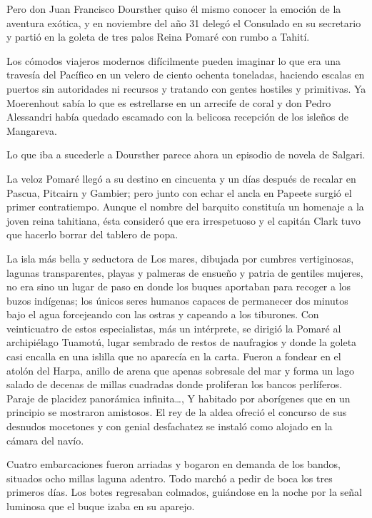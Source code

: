 \documentclass[10pt,twoside,openright]{memoir}
\begin{document}
Pero don Juan Francisco Doursther quiso él mismo conocer la emoción de
la aventura exótica, y en noviembre del año 31 delegó el Consulado en su
secretario y partió en la goleta de tres palos Reina
Pomaré con rumbo a Tahití.

Los cómodos viajeros modernos difícilmente pueden imaginar lo que era
una travesía del Pacífico en un
velero de ciento ochenta toneladas, haciendo escalas en puertos sin
autoridades ni recursos y tratando con gentes hostiles y primitivas. Ya
Moerenhout sabía lo que es
estrellarse en un arrecife de coral y don Pedro Alessandri había quedado
escamado con la belicosa recepción de los isleños de Mangareva.

Lo que iba a sucederle a Doursther parece ahora un episodio de novela de
Salgari.

 La veloz Pomaré llegó a su destino
en cincuenta y un días después de recalar en Pascua, Pitcairn y Gambier;
pero junto con echar el ancla en Papeete surgió el primer contratiempo.
Aunque el nombre del barquito constituía un homenaje a la joven reina
tahitiana, ésta consideró que era irrespetuoso y el capitán Clark tuvo
que hacerlo borrar del tablero de popa.

La isla más bella y seductora de Los mares, dibujada por cumbres
vertiginosas, lagunas transparentes,
playas y palmeras de ensueño y patria
de gentiles mujeres, no era sino un lugar de paso en donde los buques
aportaban para recoger a los buzos indígenas; los únicos seres humanos
capaces de permanecer dos minutos bajo el agua forcejeando con las
ostras y capeando a los tiburones. Con veinticuatro de estos
especialistas, más un intérprete, se dirigió la Pomaré al archipiélago
Tuamotú, lugar sembrado de restos de naufragios y donde la goleta casi
encalla en una islilla que no aparecía en la carta. Fueron a fondear en
el atolón del Harpa, anillo de arena que apenas sobresale del mar y
forma un lago salado de decenas de millas cuadradas donde proliferan los
bancos perlíferos. Paraje de placidez panorámica infinita\ldots, Y habitado
por aborígenes que en un principio se
mostraron amistosos. El rey de la aldea ofreció el concurso de sus
desnudos mocetones y con genial desfachatez se
instaló como alojado en la cámara del
navío.

Cuatro embarcaciones fueron arriadas y bogaron en demanda de los bandos,
situados ocho millas laguna adentro. Todo marchó a pedir de boca los
tres primeros días. Los botes
regresaban colmados, guiándose en la noche por la señal luminosa que el
buque izaba en su aparejo.
\end{document}
